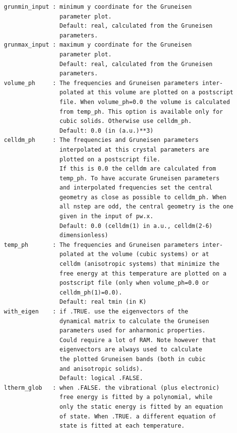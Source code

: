 \documentclass[12pt,a4paper,twoside]{report}
\begin{document}
\begin{verbatim}
grunmin_input : minimum y coordinate for the Gruneisen 
                parameter plot.
                Default: real, calculated from the Gruneisen 
                parameters.
grunmax_input : maximum y coordinate for the Gruneisen 
                parameter plot.
                Default: real, calculated from the Gruneisen 
                parameters.
volume_ph     : The frequencies and Gruneisen parameters inter-
                polated at this volume are plotted on a postscript 
                file. When volume_ph=0.0 the volume is calculated 
                from temp_ph. This option is available only for 
                cubic solids. Otherwise use celldm_ph.
                Default: 0.0 (in (a.u.)**3)
celldm_ph     : The frequencies and Gruneisen parameters 
                interpolated at this crystal parameters are 
                plotted on a postscript file. 
                If this is 0.0 the celldm are calculated from 
                temp_ph. To have accurate Gruneisen parameters 
                and interpolated frequencies set the central 
                geometry as close as possible to celldm_ph. When 
                all nstep are odd, the central geometry is the one 
                given in the input of pw.x.
                Default: 0.0 (celldm(1) in a.u., celldm(2-6) 
                dimensionless)
temp_ph       : The frequencies and Gruneisen parameters inter-
                polated at the volume (cubic systems) or at 
                celldm (anisotropic systems) that minimize the 
                free energy at this temperature are plotted on a 
                postscript file (only when volume_ph=0.0 or 
                celldm_ph(1)=0.0).
                Default: real tmin (in K)
with_eigen    : if .TRUE. use the eigenvectors of the 
                dynamical matrix to calculate the Gruneisen 
                parameters used for anharmonic properties. 
                Could require a lot of RAM. Note however that 
                eigenvectors are always used to calculate
                the plotted Gruneisen bands (both in cubic 
                and anisotropic solids).
                Default: logical .FALSE. 
ltherm_glob   : when .FALSE. the vibrational (plus electronic) 
                free energy is fitted by a polynomial, while 
                only the static energy is fitted by an equation 
                of state. When .TRUE. a different equation of 
                state is fitted at each temperature.

\end{verbatim}
\end{document}
